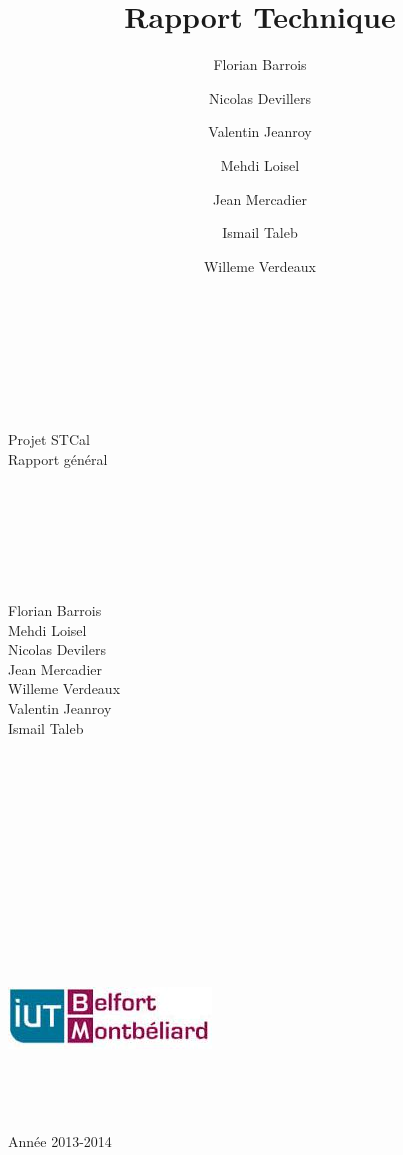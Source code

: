 \documentclass[a4paper,10pt]{report}
\title{Rapport Technique}
\author{Florian Barrois \and Nicolas Devillers \and Valentin Jeanroy \and Mehdi Loisel \and Jean Mercadier \and Ismail Taleb \and Willeme Verdeaux}
\begin{document}
  \begin{titlepage}

    \begin{center}
    ~\\~\\~\\~\\~\\
    \Huge
    Projet STCal\\
    \LARGE
    Rapport général\\
    ~\\~\\~\\~\\~\\~\\
      \begin{multicols}{3}
	\large
	Florian Barrois\\Mehdi Loisel\\
	\columnbreak 
	Nicolas Devilers\\Jean Mercadier\\Willeme Verdeaux\\
	\columnbreak
	Valentin Jeanroy\\Ismail Taleb
      \end{multicols}
    \end{center}


  \begin{center}
  ~\\~\\~\\~\\~\\~\\~\\~\\~\\~\\~\\~\\
  \includegraphics{../general/iutbm.jpeg}
  ~\\~\\~\\~\\~\\
  \large
  Année 2013-2014
  \end{center}

\end{titlepage}
\end{document}
